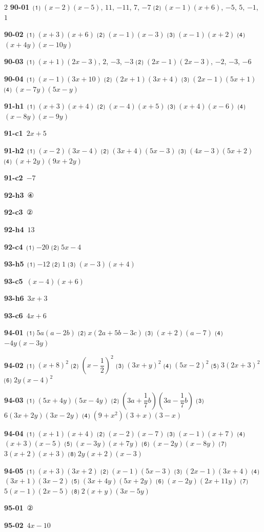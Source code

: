 \documentclass[10pt,a4paper]{article}
\begin{document}
\begin{multicols}{2}
\noindent\textbf{90-01}\ ⑴ $(x-2)(x-5)$, $11$, $-11$, $7$, $-7$ ⑵ $(x-1)(x+6)$, $-5$, $5$, $-1$, $1$\par
\noindent\textbf{90-02}\ ⑴ $(x+3)(x+6)$ ⑵ $(x-1)(x-3)$ ⑶ $(x-1)(x+2)$ ⑷ $(x+4y)(x-10y)$\par
\noindent\textbf{90-03}\ ⑴ $(x+1)(2x-3)$, $2$, $-3$, $-3$ ⑵ $(2x-1)(2x-3)$, $-2$, $-3$, $-6$\par
\noindent\textbf{90-04}\ ⑴ $(x-1)(3x+10)$ ⑵ $(2x+1)(3x+4)$ ⑶ $(2x-1)(5x+1)$ ⑷ $(x-7y)(5x-y)$\par
\noindent\textbf{91-h1}\ ⑴ $(x+3)(x+4)$ ⑵ $(x-4)(x+5)$ ⑶ $(x+4)(x-6)$ ⑷ $(x-8y)(x-9y)$\par
\noindent\textbf{91-c1}\ $2x+5$\par
\noindent\textbf{91-h2}\ ⑴ $(x-2)(3x-4)$ ⑵ $(3x+4)(5x-3)$ ⑶ $(4x-3)(5x+2)$ ⑷ $(x+2y)(9x+2y)$\par
\noindent\textbf{91-c2}\ $-7$\par
\noindent\textbf{92-h3}\ ④\par
\noindent\textbf{92-c3}\ ②\par
\noindent\textbf{92-h4}\ $13$\par
\noindent\textbf{92-c4}\ ⑴ $-20$ ⑵ $5x-4$\par
\noindent\textbf{93-h5}\ ⑴ $-12$ ⑵ $1$ ⑶ $(x-3)(x+4)$\par
\noindent\textbf{93-c5}\ $(x-4)(x+6)$\par
\noindent\textbf{93-h6}\ $3x+3$\par
\noindent\textbf{93-c6}\ $4x+6$\par
\noindent\textbf{94-01}\ ⑴ $5a(a-2b)$ ⑵ $x(2a+5b-3c)$ ⑶ $(x+2)(a-7)$ ⑷ $-4y(x-3y)$\par
\noindent\textbf{94-02}\ ⑴ $(x+8)^2$ ⑵ $\left(x-\dfrac{1}{2}\right)^2$ ⑶ $(3x+y)^2$ ⑷ $(5x-2)^2$ ⑸ $3(2x+3)^2$ ⑹ $2y(x-4)^2$\par
\noindent\textbf{94-03}\ ⑴ $(5x+4y)(5x-4y)$ ⑵ $\left(3a+\dfrac{1}{7}b\right)\left(3a-\dfrac{1}{7}b\right)$ ⑶ $6(3x+2y)(3x-2y)$ ⑷ $(9+x^2)(3+x)(3-x)$\par
\noindent\textbf{94-04}\ ⑴ $(x+1)(x+4)$ ⑵ $(x-2)(x-7)$ ⑶ $(x-1)(x+7)$ ⑷ $(x+3)(x-5)$ ⑸ $(x-3y)(x+7y)$ ⑹ $(x-2y)(x-8y)$ ⑺ $3(x+2)(x+3)$ ⑻ $2y(x+2)(x-3)$\par
\noindent\textbf{94-05}\ ⑴ $(x+3)(3x+2)$ ⑵ $(x-1)(5x-3)$ ⑶ $(2x-1)(3x+4)$ ⑷ $(3x+1)(3x-2)$ ⑸ $(3x+4y)(5x+2y)$ ⑹ $(x-2y)(2x+11y)$ ⑺ $5(x-1)(2x-5)$ ⑻ $2(x+y)(3x-5y)$\par
\noindent\textbf{95-01}\ ②\par
\noindent\textbf{95-02}\ $4x-10$\par

\end{multicols}
\end{document}
